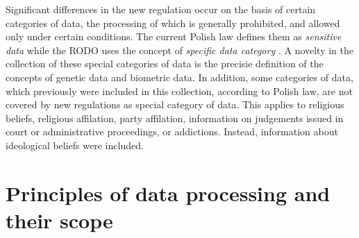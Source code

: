 \documentclass[en, noamssymb]{mgr}
\begin{document}
\indent Significant differences in the new regulation occur on the basis of certain categories of data, the processing of which is generally prohibited, and allowed only under certain conditions. The current Polish law defines them as \textit{sensitive data} \cite{uodo_art27} while the RODO uses the concept of \textit{specific data category} \cite{rodo_art9}. A novelty in the collection of these special categories of data is the precisie definition of the concepts of genetic data and biometric data. In addition, some categories of data, which previously were included in this collection, according to Polish law, are not covered by new regulations as special category of data. This applies to religious beliefs, religious affilation, party affilation, information on judgements issued in court or administrative proceedings, or addictions.  Instead, information about ideological beliefs were included.

\section{Principles of data processing and their scope}
\end{document}
